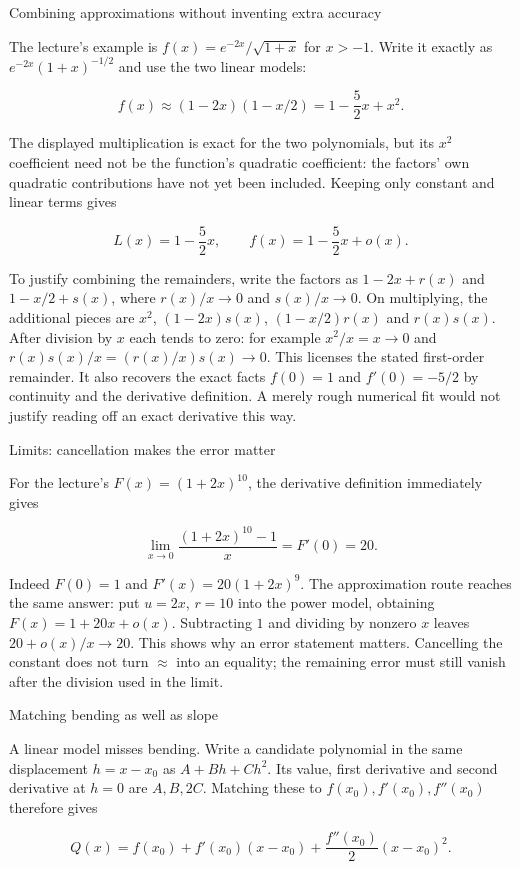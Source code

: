 \documentclass[
  11pt,
]{article}
\providecommand{\gt}{>}
\begin{document}
Combining approximations without inventing extra accuracy

The lecture's example is \(f(x)=e^{-2x}/\sqrt{1+x}\) for \(x\gt -1\).
Write it exactly as \(e^{-2x}(1+x)^{-1/2}\) and use the two linear
models:

\[f(x)\approx(1-2x)(1-x/2)=1-\frac52x+x^2.\]

The displayed multiplication is exact for the two polynomials, but its
\(x^2\) coefficient need not be the function's quadratic coefficient:
the factors' own quadratic contributions have not yet been included.
Keeping only constant and linear terms gives

\[L(x)=1-\frac52x,\qquad f(x)=1-\frac52x+o(x).\]

To justify combining the remainders, write the factors as \(1-2x+r(x)\)
and \(1-x/2+s(x)\), where \(r(x)/x\to0\) and \(s(x)/x\to0\). On
multiplying, the additional pieces are \(x^2\), \((1-2x)s(x)\),
\((1-x/2)r(x)\) and \(r(x)s(x)\). After division by \(x\) each tends to
zero: for example \(x^2/x=x\to0\) and \(r(x)s(x)/x=(r(x)/x)s(x)\to0\).
This licenses the stated first-order remainder. It also recovers the
exact facts \(f(0)=1\) and \(f'(0)=-5/2\) by continuity and the
derivative definition. A merely rough numerical fit would not justify
reading off an exact derivative this way.

Limits: cancellation makes the error matter

For the lecture's \(F(x)=(1+2x)^{10}\), the derivative definition
immediately gives

\[\lim_{x\to0}\frac{(1+2x)^{10}-1}{x}=F'(0)=20.\]

Indeed \(F(0)=1\) and \(F'(x)=20(1+2x)^9\). The approximation route
reaches the same answer: put \(u=2x\), \(r=10\) into the power model,
obtaining \(F(x)=1+20x+o(x)\). Subtracting \(1\) and dividing by nonzero
\(x\) leaves \(20+o(x)/x\to20\). This shows why an error statement
matters. Cancelling the constant does not turn \(\approx\) into an
equality; the remaining error must still vanish after the division used
in the limit.

Matching bending as well as slope

A linear model misses bending. Write a candidate polynomial in the same
displacement \(h=x-x_0\) as \(A+Bh+Ch^2\). Its value, first derivative
and second derivative at \(h=0\) are \(A,B,2C\). Matching these to
\(f(x_0),f'(x_0),f''(x_0)\) therefore gives

\[Q(x)=f(x_0)+f'(x_0)(x-x_0)+\frac{f''(x_0)}2(x-x_0)^2.\]
\end{document}
